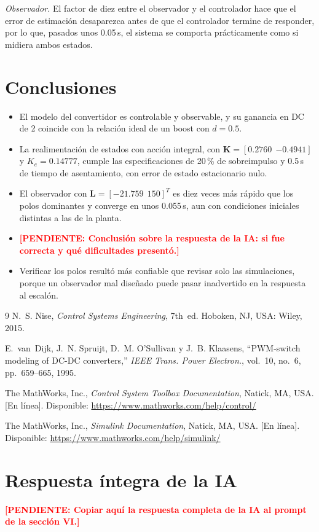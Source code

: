 \documentclass[conference,a4paper]{IEEEtran}
\newcommand{\pendiente}[1]{\textcolor{red}{\textbf{[PENDIENTE: #1]}}}
\begin{document}
\emph{Observador.} El factor de diez entre el observador y el controlador hace que el error de estimación desaparezca antes de que el controlador termine de responder, por lo que, pasados unos 0.05\,s, el sistema se comporta prácticamente como si midiera ambos estados.

\section{Conclusiones}

\begin{itemize}
\item El modelo del convertidor es controlable y observable, y su ganancia en DC de 2 coincide con la relación ideal de un boost con $d = 0.5$.
\item La realimentación de estados con acción integral, con $\mathbf{K} = [0.2760\ \ {-0.4941}]$ y $K_e = 0.14777$, cumple las especificaciones de 20\,\% de sobreimpulso y 0.5\,s de tiempo de asentamiento, con error de estado estacionario nulo.
\item El observador con $\mathbf{L} = [-21.759\ \ 150]^T$ es diez veces más rápido que los polos dominantes y converge en unos 0.055\,s, aun con condiciones iniciales distintas a las de la planta.
\item \pendiente{Conclusión sobre la respuesta de la IA: si fue correcta y qué dificultades presentó.}
\item Verificar los polos resultó más confiable que revisar solo las simulaciones, porque un observador mal diseñado puede pasar inadvertido en la respuesta al escalón.
\end{itemize}

\begin{thebibliography}{9}
N.~S. Nise, \emph{Control Systems Engineering}, 7th~ed. Hoboken, NJ, USA: Wiley, 2015.

E.~van~Dijk, J.~N. Spruijt, D.~M. O'Sullivan y J.~B. Klaasens, ``PWM-switch modeling of DC-DC converters,'' \emph{IEEE Trans. Power Electron.}, vol.~10, no.~6, pp.~659--665, 1995.

The MathWorks, Inc., \emph{Control System Toolbox Documentation}, Natick, MA, USA. [En línea]. Disponible: \url{https://www.mathworks.com/help/control/}

The MathWorks, Inc., \emph{Simulink Documentation}, Natick, MA, USA. [En línea]. Disponible: \url{https://www.mathworks.com/help/simulink/}
\end{thebibliography}

\appendices
\section{Respuesta íntegra de la IA}
\label{ap:ia}
\pendiente{Copiar aquí la respuesta completa de la IA al prompt de la sección VI.}
\end{document}
